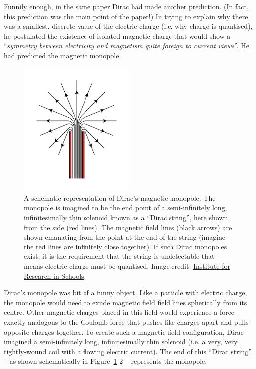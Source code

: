 Funnily enough, in the same paper Dirac had made another prediction.
(In fact, this prediction was the main point of the paper!)
In trying to explain why there was a smallest, discrete value of the
electric charge (i.e. why charge is quantised),
he postulated the existence of isolated magnetic charge that would show
a ``\emph{symmetry between electricity and magnetism quite foreign to current views}''.
He had predicted the magnetic monopole.

%
\begin{figure}[htbp]
  \centering
  \includegraphics[width=0.5\textwidth]{assets/images/dirac-monopole/dirac-monopole.png}
  \caption[A schematic representation of Dirac's magnetic monopole]
  {\label{fig:diracmonopole}%
A schematic representation of Dirac's magnetic monopole.
The monopole is imagined to be the end point of a semi-infinitely long,
infinitesimally thin solenoid known as a ``Dirac string'',
here shown from the side (red lines).
%
The magnetic field lines (black arrows) are shown emanating from the point
at the end of the string (imagine the red lines are infinitely close together).
If such Dirac monopoles exist, it is the requirement that the string is
undetectable that means electric charge must be quantised.
%
Image credit: \href{http://researchinschools.org}{Institute for Research in Schools}.}
\end{figure}
%

Dirac's monopole was bit of a funny object.
Like a particle with electric charge,
the monopole would need to exude magnetic field field lines spherically
from its centre. Other magnetic charges placed in this field would experience
a force exactly analogous to the Coulomb force that pushes like charges apart
and pulls opposite charges together.
To create such a magnetic field configuration,
Dirac imagined a semi-infinitely long, infinitesimally thin solenoid
(i.e. a very, very tightly-wound coil with a flowing electric current).
%
The end of this ``Dirac string'' -- as shown schematically in
Figure~\ref{fig:diracmonopole} 2 -- represents the monopole.

